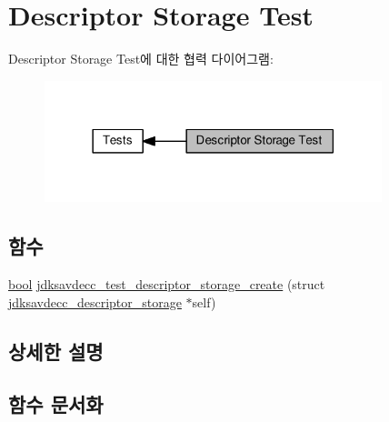 \hypertarget{group__test__descriptor__storage}{}\section{Descriptor Storage Test}
\label{group__test__descriptor__storage}
Descriptor Storage Test에 대한 협력 다이어그램\+:
\nopagebreak
\begin{figure}[H]
\begin{center}
\leavevmode
\includegraphics[width=278pt]{group__test__descriptor__storage}
\end{center}
\end{figure}
\subsection*{함수}
\begin{DoxyCompactItemize}
\item 
\hyperlink{avb__gptp_8h_af6a258d8f3ee5206d682d799316314b1}{bool} \hyperlink{group__test__descriptor__storage_ga35bb5ae3decf765e47ea6aabfe04d6e0}{jdksavdecc\+\_\+test\+\_\+descriptor\+\_\+storage\+\_\+create} (struct \hyperlink{structjdksavdecc__descriptor__storage}{jdksavdecc\+\_\+descriptor\+\_\+storage} $\ast$self)
\end{DoxyCompactItemize}


\subsection{상세한 설명}


\subsection{함수 문서화}

